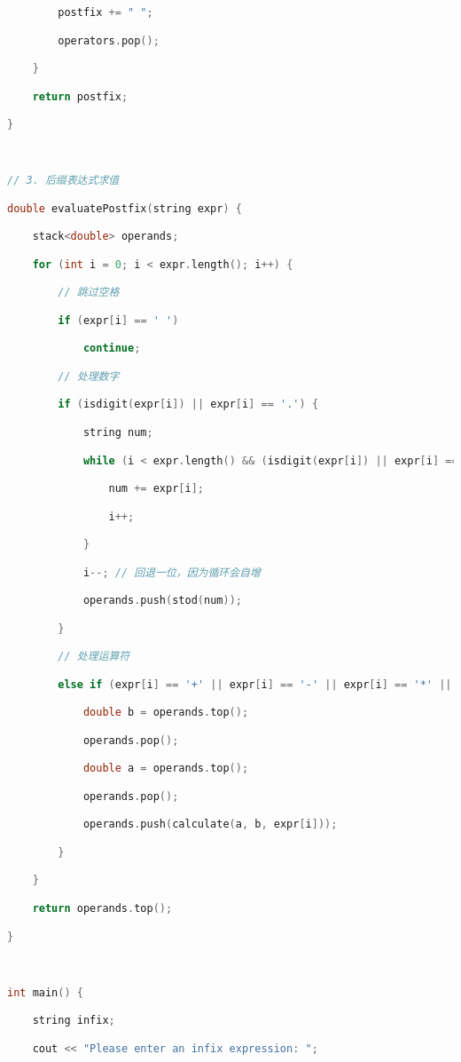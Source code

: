 \begin{lstlisting}[language=C++]
        postfix += " ";

        operators.pop();

    }

    return postfix;

}

  

// 3. 后缀表达式求值

double evaluatePostfix(string expr) {

    stack<double> operands;

    for (int i = 0; i < expr.length(); i++) {

        // 跳过空格

        if (expr[i] == ' ')

            continue;

        // 处理数字

        if (isdigit(expr[i]) || expr[i] == '.') {

            string num;

            while (i < expr.length() && (isdigit(expr[i]) || expr[i] == '.')) {

                num += expr[i];

                i++;

            }

            i--; // 回退一位，因为循环会自增

            operands.push(stod(num));

        }

        // 处理运算符

        else if (expr[i] == '+' || expr[i] == '-' || expr[i] == '*' || expr[i] == '/' || expr[i] == '^') {

            double b = operands.top();

            operands.pop();

            double a = operands.top();

            operands.pop();

            operands.push(calculate(a, b, expr[i]));

        }

    }

    return operands.top();

}

  

int main() {

    string infix;

    cout << "Please enter an infix expression: ";


\end{lstlisting}
